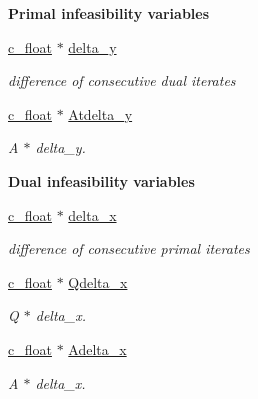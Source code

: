 \begin{Indent}\textbf{ Primal infeasibility variables}\par
\begin{DoxyCompactItemize}
\item 
\mbox{\hyperlink{global__opts_8h_a7f1a9fda95e52979658c20a0d134fb15}{c\+\_\+float}} $\ast$ \mbox{\hyperlink{structQPALMWorkspace_a0454fc1ea5ab776f3cd0a2a4856220e8}{delta\+\_\+y}}
\begin{DoxyCompactList}\small\item\em difference of consecutive dual iterates \end{DoxyCompactList}\item 
\mbox{\hyperlink{global__opts_8h_a7f1a9fda95e52979658c20a0d134fb15}{c\+\_\+float}} $\ast$ \mbox{\hyperlink{structQPALMWorkspace_ade9257729131b7c2806b5d7ff3cb10b3}{Atdelta\+\_\+y}}
\begin{DoxyCompactList}\small\item\em A\textquotesingle{} $\ast$ delta\+\_\+y. \end{DoxyCompactList}\end{DoxyCompactItemize}
\end{Indent}
\begin{Indent}\textbf{ Dual infeasibility variables}\par
\begin{DoxyCompactItemize}
\item 
\mbox{\hyperlink{global__opts_8h_a7f1a9fda95e52979658c20a0d134fb15}{c\+\_\+float}} $\ast$ \mbox{\hyperlink{structQPALMWorkspace_a84a2e58667872450dd7de728e98d8532}{delta\+\_\+x}}
\begin{DoxyCompactList}\small\item\em difference of consecutive primal iterates \end{DoxyCompactList}\item 
\mbox{\hyperlink{global__opts_8h_a7f1a9fda95e52979658c20a0d134fb15}{c\+\_\+float}} $\ast$ \mbox{\hyperlink{structQPALMWorkspace_a7a10abcbd6a5e3cb44b7dca2cf679c7a}{Qdelta\+\_\+x}}
\begin{DoxyCompactList}\small\item\em Q $\ast$ delta\+\_\+x. \end{DoxyCompactList}\item 
\mbox{\hyperlink{global__opts_8h_a7f1a9fda95e52979658c20a0d134fb15}{c\+\_\+float}} $\ast$ \mbox{\hyperlink{structQPALMWorkspace_a756837945d447a7d5b5eac82ae0b71aa}{Adelta\+\_\+x}}
\begin{DoxyCompactList}\small\item\em A $\ast$ delta\+\_\+x. \end{DoxyCompactList}\end{DoxyCompactItemize}
\end{Indent}
